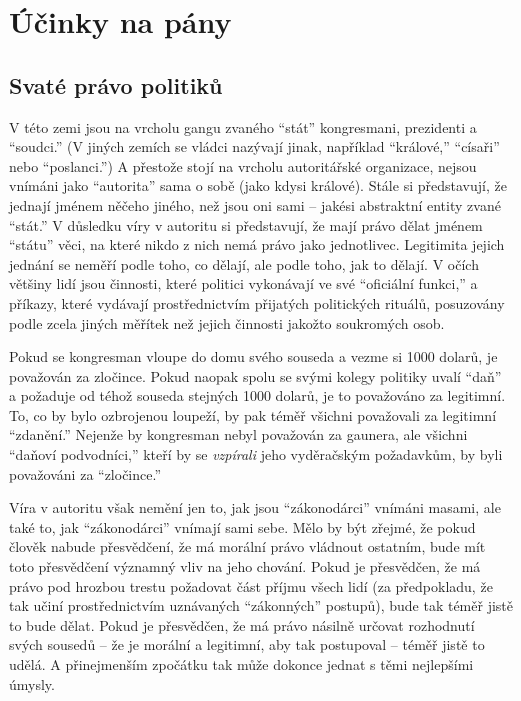 \documentclass{book}
\begin{document}
\chapter{Účinky na pány}

\section{Svaté právo politiků}

V této zemi jsou na vrcholu gangu zvaného \enquote{stát} kongresmani, prezidenti a \enquote{soudci.} (V jiných zemích se vládci nazývají jinak, například \enquote{králové,} \enquote{císaři} nebo \enquote{poslanci.}) A přestože stojí na vrcholu autoritářské organizace, nejsou vnímáni jako \enquote{autorita} sama o sobě (jako kdysi králové). Stále si představují, že jednají jménem něčeho jiného, než jsou oni sami -- jakési abstraktní entity zvané \enquote{stát.} V důsledku víry v autoritu si představují, že mají právo dělat jménem \enquote{státu} věci, na které nikdo z nich nemá právo jako jednotlivec. Legitimita jejich jednání se neměří podle toho, co dělají, ale podle toho, jak to dělají. V očích většiny lidí jsou činnosti, které politici vykonávají ve své \enquote{oficiální funkci,} a příkazy, které vydávají prostřednictvím přijatých politických rituálů, posuzovány podle zcela jiných měřítek než jejich činnosti jakožto soukromých osob.

Pokud se kongresman vloupe do domu svého souseda a vezme si 1000 dolarů, je považován za zločince. Pokud naopak spolu se svými kolegy politiky uvalí \enquote{daň} a požaduje od téhož souseda stejných 1000 dolarů, je to považováno za legitimní. To, co by bylo ozbrojenou loupeží, by pak téměř všichni považovali za legitimní \enquote{zdanění.} Nejenže by kongresman nebyl považován za gaunera, ale všichni \enquote{daňoví podvodníci,} kteří by se \emph{vzpírali} jeho vyděračským požadavkům, by byli považováni za \enquote{zločince.}

Víra v autoritu však nemění jen to, jak jsou \enquote{zákonodárci} vnímáni masami, ale také to, jak \enquote{zákonodárci} vnímají sami sebe. Mělo by být zřejmé, že pokud člověk nabude přesvědčení, že má morální právo vládnout ostatním, bude mít toto přesvědčení významný vliv na jeho chování. Pokud je přesvědčen, že má právo pod hrozbou trestu požadovat část příjmu všech lidí (za předpokladu, že tak učiní prostřednictvím uznávaných \enquote{zákonných} postupů), bude tak téměř jistě to bude dělat. Pokud je přesvědčen, že má právo násilně určovat rozhodnutí svých sousedů -- že je morální a legitimní, aby tak postupoval -- téměř jistě to udělá. A přinejmenším zpočátku tak může dokonce jednat s těmi nejlepšími úmysly.
\end{document}
